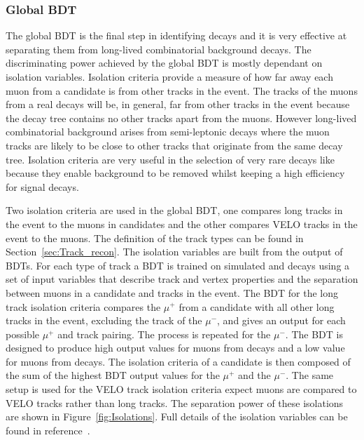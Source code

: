 \subsubsection{Global BDT}
\label{sec:globalBDT}

The global BDT is the final step in identifying \bmumu decays and it is very effective at separating them from long-lived combinatorial background decays. The discriminating power achieved by the global BDT is mostly dependant on isolation variables. Isolation criteria provide a measure of how far away each muon from a \bmumu candidate is from other tracks in the event. The tracks of the muons from a real \bmumu decays will be, in general, far from other tracks in the event because the \bmumu decay tree contains no other tracks apart from the muons. However long-lived combinatorial background arises from semi-leptonic decays where the muon tracks are likely to be close to other tracks that originate from the same decay tree. %
Isolation criteria are very useful in the selection of very rare decays like \bsmumu because they enable background to be removed whilst keeping a high efficiency for signal decays.

Two isolation criteria are used in the global BDT, one compares long tracks in the event to the muons in \bmumu candidates and the other compares VELO tracks in the event to the muons. The definition of the track types can be found in Section~\ref{sec:Track_recon}. The isolation variables are built from the output of BDTs. For each type of track a BDT is trained on simulated \bsmumu and \bbbarmumux decays using a set of input variables that describe track and vertex properties and the separation between muons in a \bmumu candidate and tracks in the event. 
The BDT for the long track isolation criteria compares the $\mu^{+}$ from a \bsmumu candidate with all other long tracks in the event, excluding the track of the $\mu^{-}$, and gives an output for each possible $\mu^{+}$ and track pairing. The process is repeated for the $\mu^{-}$. The BDT is designed to produce high output values for muons from \bbbarmumux decays and a low value for muons from \bsmumu decays. The isolation criteria of a \bsmumu candidate is then composed of the sum of the highest BDT output values for the $\mu^{+}$ and the $\mu^{-}$. The same setup is used for the VELO track isolation criteria expect muons are compared to VELO tracks rather than long tracks. The separation power of these isolations are shown in Figure~\ref{fig:Isolations}. Full details of the isolation variables can be found in reference~\cite{Archilli:1970886}.



